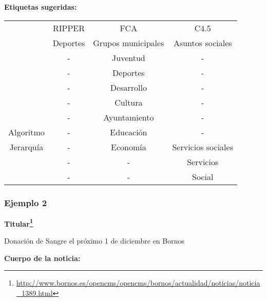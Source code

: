 \textbf{Etiquetas sugeridas:}
\begin{center}
\begin{table}[h]
\centering
\begin{tabular}{c|c|c|c|}
\cline{2-4}
          & RIPPER   & FCA                & C4.5               \\ \cline{2-4} 
          & Deportes & Grupos municipales & Asuntos sociales   \\ \cline{2-4} 
          & -        & Juventud           & -                  \\ \cline{2-4} 
          & -        & Deportes           & -                  \\ \cline{2-4} 
          & -        & Desarrollo         & -                  \\ \cline{2-4} 
          & -        & Cultura            & -                  \\ \cline{2-4} 
          & -        & Ayuntamiento       & -                  \\ \cline{2-4} 
Algoritmo & -        & Educación          & -                  \\ \hline
Jerarquía & -        & Economía           & Servicios sociales \\ \cline{2-4} 
          & -        & -                  & Servicios          \\ \cline{2-4} 
          & -        & -                  & Social             \\ \cline{2-4} 
\end{tabular}
\end{table}
\end{center}
\subsubsection*{Ejemplo 2}
\textbf{Titular\footnote{\url{http://www.bornos.es/opencms/opencms/bornos/actualidad/noticias/noticia_1389.html}}}

Donación de Sangre el próximo 1 de diciembre en Bornos

\textbf{Cuerpo de la noticia:}

